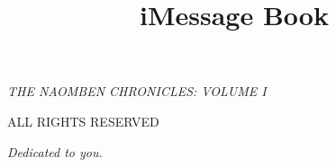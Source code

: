 \documentclass[9pt,postvopaper]{memoir}
\author{}
\title{iMessage Book}
\date{}
\begin{document}
\frontmatter

\begin{titlingpage}
\maketitle
\clearpage
\begin{flushleft}
\null\vfill
\textit{THE NAOMBEN CHRONICLES: VOLUME I}
\bigskip





ALL RIGHTS RESERVED
\end{flushleft}
\end{titlingpage}

\movetooddpage
\begin{vplace}
\begin{center}
  \textit{Dedicated to you.}
\end{center}
\end{vplace}

\movetooddpage
\tableofcontents 

\cleartorecto
\mainmatter

\openany
{}
\addtolength\afterchapskip{2cm}


\end{document}
